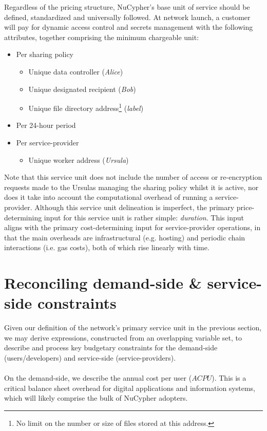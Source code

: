 \documentclass[longbibliography,nofootinbib]{revtex4-1}
\begin{document}
Regardless of the pricing structure, NuCypher’s base unit of service should be defined, standardized and universally followed. At network launch, a customer will pay for dynamic access control and secrets management with the following attributes, together comprising the minimum chargeable unit: 
\begin{itemize}
    \item Per sharing policy
    \begin{itemize}
        \item Unique data controller (\textit{Alice})
        \item Unique designated recipient (\textit{Bob})
        \item Unique file directory address\footnote{No limit on the number or size of files stored at this address.} (\textit{label})
    \end{itemize}
    \item Per 24-hour period
    \item Per service-provider
    \begin{itemize}
        \item Unique worker address (\textit{Ursula})
    \end{itemize}
\end{itemize}

Note that this service unit does not include the number of access or re-encryption requests made to the Ursulas managing the sharing policy whilst it is active, nor does it take into account the computational overhead of running a service-provider. Although this service unit delineation is imperfect, the primary price-determining input for this service unit is rather simple: \textit{duration}. This input aligns with the primary cost-determining input for service-provider operations, in that the main overheads are infrastructural (e.g. hosting) and periodic chain interactions (i.e. gas costs), both of which rise linearly with time. 

\section{Reconciling demand-side \& service-side constraints} \label{dvss}

Given our definition of the network's primary service unit in the previous section, we may derive expressions, constructed from an overlapping variable set, to describe and process key budgetary constraints for the demand-side (users/developers) and service-side (service-providers). 
\\\\
On the demand-side, we describe the annual cost per user ($ACPU$). This is a critical balance sheet overhead for digital applications and information systems, which will likely comprise the bulk of NuCypher adopters.
\end{document}
